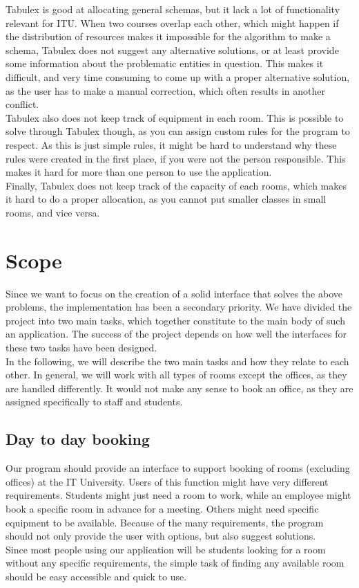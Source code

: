 Tabulex is good at allocating general schemas, but it lack a lot of functionality relevant for ITU. When two courses overlap each other, which might happen if the distribution of resources makes it impossible for the algorithm to make a schema, Tabulex does not suggest any alternative solutions, or at least provide some information about the problematic entities in question. This makes it difficult, and very time consuming to come up with a proper alternative solution, as the user has to make a manual correction, which often results in another conflict. \\
Tabulex also does not keep track of equipment in each room. This is possible to solve through Tabulex though, as you can assign custom rules for the program to respect. As this is just simple rules, it might be hard to understand why these rules were created in the first place, if you were not the person responsible. This makes it hard for more than one person to use the application.\\
Finally, Tabulex does not keep track of the capacity of each rooms, which makes it hard to do a proper allocation, as you cannot put smaller classes in small rooms, and vice versa.

\label{sec:scope}
\section{Scope}
 Since we want to focus on the creation of a solid interface that solves the above problems, the implementation has been a secondary priority. We have divided the project into two main tasks, which together constitute to the main body of such an application. The success of the project depends on how well the interfaces for these two tasks have been designed.\\
In the following, we will describe the two main tasks and how they relate to each other. In general, we will work with all types of rooms except the offices, as they are handled differently. It would not make any sense to book an office, as they are assigned specifically to staff and students.

\subsection{Day to day booking}
\label{chap1:day_to_day_booking}
Our program should provide an interface to support booking of rooms (excluding offices) at the IT University. Users of this function might have very different requirements. Students might just need a room to work, while an employee might book a specific room in advance for a meeting. Others might need specific equipment to be available. Because of the many requirements, the program should not only provide the user with options, but also suggest solutions.\\
Since most people using our application will be students looking for a room without any specific requirements, the simple task of finding any available room should be easy accessible and quick to use. \\

